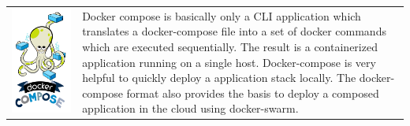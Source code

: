 \begin{table}[h!]
  \centering
  \begin{tabular}{ c m{9cm} }
    \begin{minipage}{.3\textwidth}
      \includegraphics[width=\linewidth]{images/dependencies/docker-compose}
    \end{minipage}&
    Docker compose is basically only a CLI application which translates a
    docker-compose file into a set of docker commands which are executed
    sequentially. The result is a containerized application running on a single
    host. Docker-compose is very helpful to quickly deploy a \ms{} application
    stack locally. The docker-compose format also provides the basis to deploy a
    composed application in the cloud using docker-swarm.
  \end{tabular}
\end{table}

